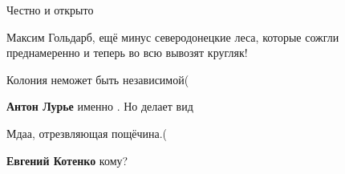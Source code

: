 \begin{itemize}
 
Честно и открыто

 
Максим Гольдарб, ещё минус северодонецкие леса, которые сожгли преднамеренно и теперь во всю вывозят кругляк!

 
Колония неможет быть независимой(

\begin{itemize}
 
\textbf{Антон Лурье} именно . Но делает вид
\end{itemize}

 
Мдаа, отрезвляющая пощёчина.(

\begin{itemize}
 
\textbf{Евгений Котенко} кому?

 

\end{itemize}
\end{itemize}

